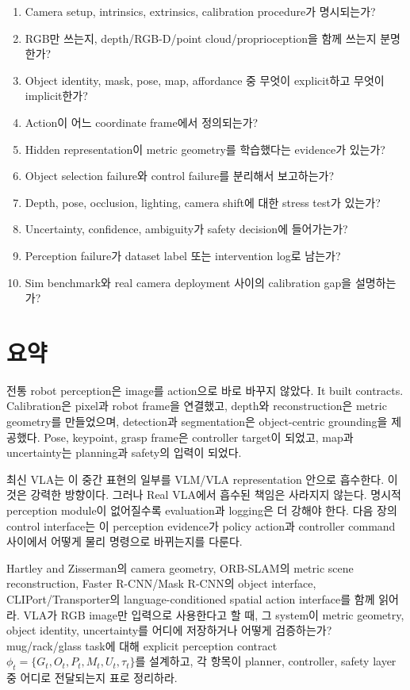 \begin{enumerate}
  \item Camera setup, intrinsics, extrinsics, calibration procedure가 명시되는가?
  \item RGB만 쓰는지, depth/RGB-D/point cloud/proprioception을 함께 쓰는지 분명한가?
  \item Object identity, mask, pose, map, affordance 중 무엇이 explicit하고 무엇이 implicit한가?
  \item Action이 어느 coordinate frame에서 정의되는가?
  \item Hidden representation이 metric geometry를 학습했다는 evidence가 있는가?
  \item Object selection failure와 control failure를 분리해서 보고하는가?
  \item Depth, pose, occlusion, lighting, camera shift에 대한 stress test가 있는가?
  \item Uncertainty, confidence, ambiguity가 safety decision에 들어가는가?
  \item Perception failure가 dataset label 또는 intervention log로 남는가?
  \item Sim benchmark와 real camera deployment 사이의 calibration gap을 설명하는가?
\end{enumerate}

\section{요약}

전통 robot perception은 image를 action으로 바로 바꾸지 않았다. It built contracts. Calibration은 pixel과 robot frame을 연결했고, depth와 reconstruction은 metric geometry를 만들었으며, detection과 segmentation은 object-centric grounding을 제공했다. Pose, keypoint, grasp frame은 controller target이 되었고, map과 uncertainty는 planning과 safety의 입력이 되었다.

최신 VLA는 이 중간 표현의 일부를 VLM/VLA representation 안으로 흡수한다. 이것은 강력한 방향이다. 그러나 Real VLA에서 흡수된 책임은 사라지지 않는다. 명시적 perception module이 없어질수록 evaluation과 logging은 더 강해야 한다. 다음 장의 control interface는 이 perception evidence가 policy action과 controller command 사이에서 어떻게 물리 명령으로 바뀌는지를 다룬다.

\chapterwork
{Hartley and Zisserman의 camera geometry, ORB-SLAM의 metric scene reconstruction, Faster R-CNN/Mask R-CNN의 object interface, CLIPort/Transporter의 language-conditioned spatial action interface를 함께 읽어라.}
{VLA가 RGB image만 입력으로 사용한다고 할 때, 그 system이 metric geometry, object identity, uncertainty를 어디에 저장하거나 어떻게 검증하는가?}
{mug/rack/glass task에 대해 explicit perception contract $\phi_t=\{G_t,O_t,P_t,M_t,U_t,\tau_t\}$를 설계하고, 각 항목이 planner, controller, safety layer 중 어디로 전달되는지 표로 정리하라.}
